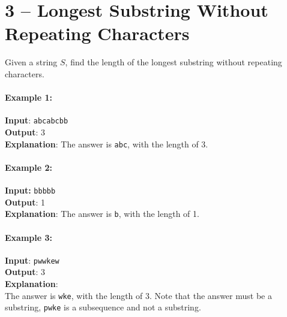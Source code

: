 \section{3 --  Longest Substring Without Repeating Characters}
Given a string $S$, find the length of the longest substring without repeating characters.

\paragraph{Example 1:}
\begin{flushleft}
\textbf{Input}: \texttt{abcabcbb}
\\
\textbf{Output}: 3 
\\
\textbf{Explanation}: The answer is \texttt{abc}, with the length of 3. 
\end{flushleft}

\paragraph{Example 2:}
\begin{flushleft}
\textbf{Input:} \texttt{bbbbb}
\\
\textbf{Output}: 1
\\
\textbf{Explanation}: The answer is \texttt{b}, with the length of 1.
\end{flushleft}

\paragraph{Example 3:}

\begin{flushleft}
\textbf{Input}: \texttt{pwwkew}
\\
\textbf{Output}: 3
\\
\textbf{Explanation}:
\\
The answer is \texttt{wke}, with the length of 3. Note that the answer must be a substring, \texttt{pwke} is a subsequence and not a substring.

\end{flushleft}
